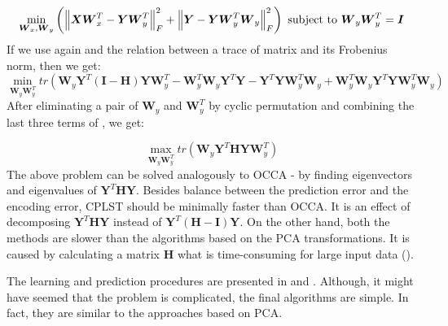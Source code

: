 \begin{equation}\label{eq:cplst5}
    \min_{\boldsymbol{W}_x, \boldsymbol{W}_y} \left(\left\lVert\boldsymbol{X}\boldsymbol{W}_x^T-\boldsymbol{Y}\boldsymbol{W}_y^T\right\rVert_{F}^2 + \left\lVert\boldsymbol{Y}-\boldsymbol{Y}\boldsymbol{W}_y^T\boldsymbol{W}_y\right\rVert_{F}^2\right)  
    \text{  subject to   } \boldsymbol{W}_y\boldsymbol{W}_y^T=\boldsymbol{I}   
\end{equation}
If we use again  and the relation between a trace of matrix and its Frobenius norm, then we get:
\begin{equation}\label{eq:cplst6}
    \min_{\boldsymbol{W}_y\boldsymbol{W}_y^T} tr(\boldsymbol{W}_y\boldsymbol{Y}^T(\boldsymbol{I}-\boldsymbol{H})\boldsymbol{Y}\boldsymbol{W}_y^T-\boldsymbol{W}_y^T\boldsymbol{W}_y\boldsymbol{Y}^T\boldsymbol{Y}-\boldsymbol{Y}^T\boldsymbol{Y}\boldsymbol{W}_y^T\boldsymbol{W}_y+\boldsymbol{W}_y^T\boldsymbol{W}_y\boldsymbol{Y}^T\boldsymbol{Y}\boldsymbol{W}_y^T\boldsymbol{W}_y)  
\end{equation}
After eliminating a pair of $\boldsymbol{W}_y$ and $\boldsymbol{W}_y^T$ by cyclic permutation and combining the last three terms of , we get:

\begin{equation}\label{eq:cplst6}
    \max_{\boldsymbol{W}_y\boldsymbol{W}_y^T} tr(\boldsymbol{W}_y\boldsymbol{Y}^T\boldsymbol{H}\boldsymbol{Y}\boldsymbol{W}_y^T)  
\end{equation}
The above problem can be solved analogously to OCCA - by finding eigenvectors and eigenvalues of $\boldsymbol{Y}^T\boldsymbol{H}\boldsymbol{Y}$. Besides balance between the prediction error and the encoding error, CPLST should be minimally faster than OCCA. It is an effect of decomposing $\boldsymbol{Y}^T\boldsymbol{H}\boldsymbol{Y}$ instead of $\boldsymbol{Y}^T(\boldsymbol{H}-\boldsymbol{I})\boldsymbol{Y}$. On the other hand, both the methods are slower than the algorithms based on the PCA transformations. It is caused by calculating a matrix $\boldsymbol{H}$ what is time-consuming for large input data (\cite{ChenLin}).

The learning and prediction procedures are presented in  and . Although, it might have seemed that the problem is complicated, the final algorithms are simple. In fact, they are similar to the approaches based on PCA. 

